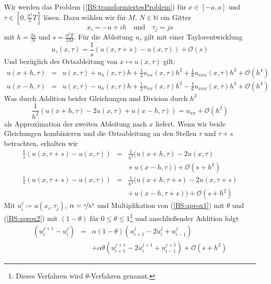Wir werden das Problem (\ref{BS:transformiertesProblem}) für $x\in\left[-a,a\right]$ und $\tau \in \left[0,\frac{\sigma^2}{2}T\right]$ lösen.
Dazu wählen wir für $M,\, N \in \mathbb{N}$ ein Gitter 
\begin{equation}
x_i = -a + ih\quad \text{und}\quad  \tau _j = js
\end{equation}
mit $h=\frac{2a}{N}$ und $s = \frac{\sigma^2T}{2M}$.
Für die Ableitung $u_{\tau}$ gilt mit einer Taylorentwicklung
\begin{equation}
u_{\tau}(x,\tau) = \frac{1}{s}\left(u(x,\tau+s)-u(x,\tau)\right) + \mathcal{O}(s)
\end{equation}
Und bezüglich der Ortsableitung von $x \mapsto u(x,\tau)$ gilt:
\begin{eqnarray*}
u(x+h,\tau) & = & u(x,\tau) + u_x(x,\tau)h+\frac{1}{2}u_{xx}(x,\tau)h^2+\frac{1}{6}u_{xxx}(x,\tau)h^3 + \mathcal{O}\left(h^4\right) \\
u(x-h,\tau) & = & u(x,\tau) - u_x(x,\tau)h+\frac{1}{2}u_{xx}(x,\tau)h^2-\frac{1}{6}u_{xxx}(x,\tau)h^3 + \mathcal{O}\left(h^4\right)
\end{eqnarray*}
Was durch Addition beider Gleichungen und Division durch $h^2$ 
\begin{equation*}
\frac{1}{h^2}\left(u(x+h,\tau) - 2u(x,\tau) + u(x-h,\tau)\right) = u_{xx} + \mathcal{O}\left(h^2\right)
\end{equation*}
als Approximation der zweiten Ableitung nach $x$ liefert. Wenn wir beide Gleichungen kombinieren und die Ortsableitung an den Stellen $\tau$ und $\tau+s$ betrachten, erhalten wir
\begin{eqnarray}
\frac{1}{s}\left(u(x,\tau+s)-u(x,\tau)\right) & = & \frac{1}{h^2}(u(x+h,\tau) - 2u(x,\tau) \nonumber \\
                                              &  & + \,u(x-h,\tau)) + \mathcal{O}(s+h^2) \label{BS:aprox1} \\
\frac{1}{s}\left(u(x,\tau+s)-u(x,\tau)\right) & = & \frac{1}{h^2}(u(x+h,\tau+s) - 2u(x,\tau+s) \nonumber \\
                                              &  & + \,u(x-h,\tau+s)) + \mathcal{O}(s+h^2) \label{BS:aprox2}
\end{eqnarray}
Mit $u_i^j \coloneqq u\left(x_i,\tau _j\right)$, $\alpha = \nicefrac{s}{h^2}$ und Multiplikation von (\ref{BS:aprox1}) mit $\theta$ und (\ref{BS:aprox2}) mit $\left(1-\theta\right)$ für $0\leq\theta\leq 1$\footnote{Dieses Verfahren wird $\theta$-Verfahren genannt.} und anschließender Addition folgt
\begin{eqnarray*}
\left(u_i^{j+1} - u_i^j \right) & = & \alpha(1-\theta)\left(u_{i+1}^j - 2u_i^j + u_{i-1}^j\right)\\
 & &+ \alpha\theta\left(u_{i+1}^{j+1}-2u_i^{j+1}+u_{i-1}^{j+1}\right) + \mathcal{O}\left(s+h^2\right)
\end{eqnarray*}
